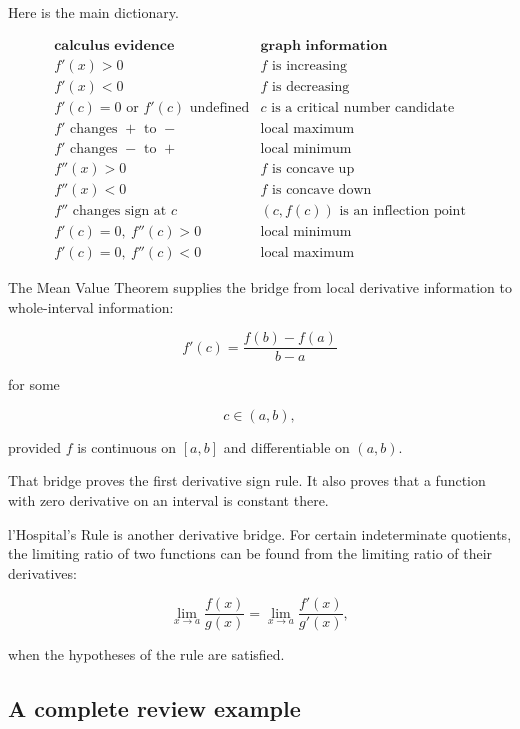 Here is the main dictionary.

\[
\begin{array}{c|c}
\textbf{calculus evidence} & \textbf{graph information} \\ \hline
f'(x)>0 & f \text{ is increasing} \\[3pt]
f'(x)<0 & f \text{ is decreasing} \\[3pt]
f'(c)=0 \text{ or } f'(c)\text{ undefined} & c \text{ is a critical number candidate} \\[3pt]
f' \text{ changes } + \text{ to } - & \text{local maximum} \\[3pt]
f' \text{ changes } - \text{ to } + & \text{local minimum} \\[3pt]
f''(x)>0 & f \text{ is concave up} \\[3pt]
f''(x)<0 & f \text{ is concave down} \\[3pt]
f'' \text{ changes sign at } c & (c,f(c)) \text{ is an inflection point} \\[3pt]
f'(c)=0,\ f''(c)>0 & \text{local minimum} \\[3pt]
f'(c)=0,\ f''(c)<0 & \text{local maximum}
\end{array}
\]

The Mean Value Theorem supplies the bridge from local derivative information to
whole-interval information:

\[
\boxed{
f'(c)=\frac{f(b)-f(a)}{b-a}
}
\]

for some

\[
c\in(a,b),
\]

provided \(f\) is continuous on \([a,b]\) and differentiable on \((a,b)\).

That bridge proves the first derivative sign rule.  It also proves that a function with
zero derivative on an interval is constant there.

l'Hospital's Rule is another derivative bridge.  For certain indeterminate quotients,
the limiting ratio of two functions can be found from the limiting ratio of their
derivatives:

\[
\lim_{x\to a}\frac{f(x)}{g(x)}
=
\lim_{x\to a}\frac{f'(x)}{g'(x)},
\]

when the hypotheses of the rule are satisfied.

\subsection{A complete review example}
\label{subsec:chapter-6-complete-review-example}

